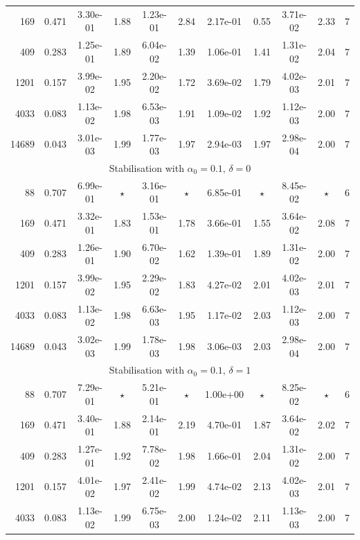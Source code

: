 \documentclass[onefignum,onetabnum,reqno,a4paper,final]{siamart250211}
\newcommand\0{\mathbf{0}}
\numberwithin{figure}{section}
\numberwithin{table}{section}
\begin{document}
{\begin{table}[t!]
{\begin{tabular}{|rcccccccccc|}
            169 & 0.471 & 3.30e-01 & 1.88 & 1.23e-01 & 2.84 & 2.17e-01 & 0.55 & 3.71e-02 & 2.33 &  7\\
            409 & 0.283 & 1.25e-01 & 1.89 & 6.04e-02 & 1.39 & 1.06e-01 & 1.41 & 1.31e-02 & 2.04 &  7\\
            1201 & 0.157 & 3.99e-02 & 1.95 & 2.20e-02 & 1.72 & 3.69e-02 & 1.79 & 4.02e-03 & 2.01 &  7\\
            4033 & 0.083 & 1.13e-02 & 1.98 & 6.53e-03 & 1.91 & 1.09e-02 & 1.92 & 1.12e-03 & 2.00 &  7\\
            14689 & 0.043 & 3.01e-03 & 1.99 & 1.77e-03 & 1.97 & 2.94e-03 & 1.97 & 2.98e-04 & 2.00 &  7\\
            \hline 
            \multicolumn{11}{|c|}{Stabilisation with $\alpha_0=0.1,\,\delta=0$} \\
            \hline
            88 & 0.707 & 6.99e-01 & $\star$ & 3.16e-01 & $\star$ & 6.85e-01 & $\star$ & 8.45e-02 & $\star$ &  6\\
            169 & 0.471 & 3.32e-01 & 1.83 & 1.53e-01 & 1.78 & 3.66e-01 & 1.55 & 3.64e-02 & 2.08 &  7\\
            409 & 0.283 & 1.26e-01 & 1.90 & 6.70e-02 & 1.62 & 1.39e-01 & 1.89 & 1.31e-02 & 2.00 &  7\\
            1201 & 0.157 & 3.99e-02 & 1.95 & 2.29e-02 & 1.83 & 4.27e-02 & 2.01 & 4.02e-03 & 2.01 &  7\\
            4033 & 0.083 & 1.13e-02 & 1.98 & 6.63e-03 & 1.95 & 1.17e-02 & 2.03 & 1.12e-03 & 2.00 &  7\\
            14689 & 0.043 & 3.02e-03 & 1.99 & 1.78e-03 & 1.98 & 3.06e-03 & 2.03 & 2.98e-04 & 2.00 &  7\\
            \hline 
            \multicolumn{11}{|c|}{Stabilisation with $\alpha_0=0.1,\,\delta=1$ } \\
            \hline
            88 & 0.707 & 7.29e-01 & $\star$ & 5.21e-01 & $\star$ & 1.00e+00 & $\star$ & 8.25e-02 & $\star$ &  6\\
            169 & 0.471 & 3.40e-01 & 1.88 & 2.14e-01 & 2.19 & 4.70e-01 & 1.87 & 3.64e-02 & 2.02 &  7\\
            409 & 0.283 & 1.27e-01 & 1.92 & 7.78e-02 & 1.98 & 1.66e-01 & 2.04 & 1.31e-02 & 2.00 &  7\\
            1201 & 0.157 & 4.01e-02 & 1.97 & 2.41e-02 & 1.99 & 4.74e-02 & 2.13 & 4.02e-03 & 2.01 &  7\\
            4033 & 0.083 & 1.13e-02 & 1.99 & 6.75e-03 & 2.00 & 1.24e-02 & 2.11 & 1.13e-03 & 2.00 &  7\\

\end{tabular}}
\end{table}}
\end{document}
